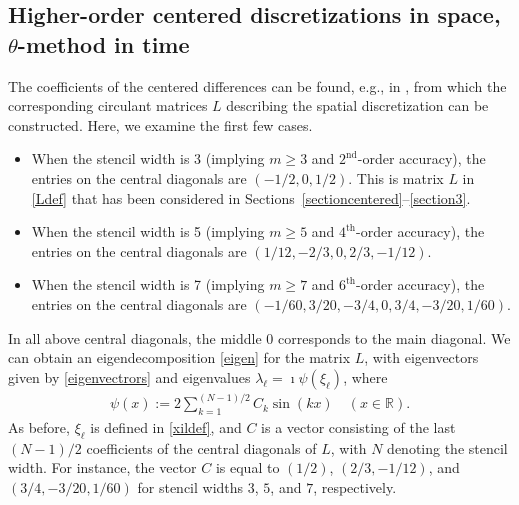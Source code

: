 \documentclass[a4paper]{article}
\newcommand{\rr}{\mathbb{R}}
\begin{document}
\subsection{Higher-order centered discretizations in space, \texorpdfstring{$\theta$}{}-method in time}\label{highercentered}
The coefficients of the centered differences can be found, e.g., in \cite{bengt}, from which the
corresponding circulant matrices $L$ describing the spatial discretization can be constructed.
Here, we examine the first few cases.
\begin{itemize}
\item When the stencil width is 3 (implying  $m\ge 3$ and $2^\text{nd}$-order accuracy), the entries on
the central diagonals are $(-1/2, 0, 1/2)$. This is matrix $L$ in \eqref{Ldef} that has been considered in
Sections~\ref{sectioncentered}--\ref{section3}.
\item When the stencil width is 5 (implying  $m\ge 5$ and $4^\text{th}$-order accuracy), the entries on
the central diagonals are $(1/12, -2/3, 0, 2/3, -1/12)$.
\item When the stencil width is 7 (implying $m\ge 7$ and $6^\text{th}$-order accuracy), the entries on the
central diagonals are $(-1/60, 3/20, -3/4, 0, 3/4, -3/20, 1/60)$.
\end{itemize}
In all above central diagonals, the middle $0$ corresponds to the main diagonal.
We can obtain an eigendecomposition \eqref{eigen} for the matrix $L$, with eigenvectors given by
\eqref{eigenvectrors} and eigenvalues $\lambda_\ell = \imath \psi(\xi_\ell)$, where
\begin{align}\label{psi}
	\psi(x) := 2 \sum_{k=1}^{(N-1)/2} C_k \sin(k x) \quad (x\in\rr).
\end{align}
As before, $\xi_\ell$ is defined in \eqref{xildef}, and $C$ is a vector consisting of the last $(N-1)/2$
coefficients of the central diagonals of $L$, with $N$ denoting the stencil width.
For instance, the vector $C$ is equal to $(1/2)$, $(2/3,-1/12)$, and $(3/4,-3/20,1/60)$ for stencil widths
$3$, $5$, and $7$, respectively.
\end{document}

